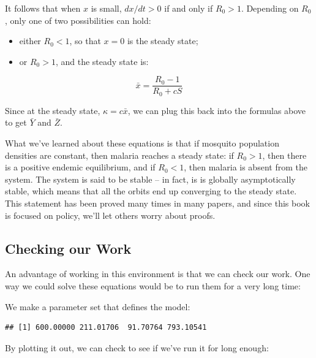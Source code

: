 \documentclass[
]{book}
\begin{document}
It follows that when \(x\) is small, \(dx/dt>0\) if and only if \(R_0 > 1\). Depending on \(R_0\), only one of two possibilities can hold:

\begin{itemize}
\item
  either \(R_0<1\), so that \(x=0\) is the steady state;
\item
  or \(R_0 > 1\), and the steady state is:
\end{itemize}

\begin{equation}
\bar x = \frac{R_0 -1}{R_0 + c S} 
\end{equation}

Since at the steady state, \(\kappa = c \bar x\), we can plug this back into the formulas above to get \(\bar Y\) and \(\bar Z\).

What we've learned about these equations is that if mosquito population densities are constant, then malaria reaches a steady state: if \(R_0 >1\), then there is a positive endemic equilibrium, and if \(R_0 < 1\), then malaria is absent from the system. The system is said to be stable -- in fact, is is globally asymptotically stable, which means that all the orbits end up converging to the steady state. This statement has been proved many times in many papers, and since this book is focused on policy, we'll let others worry about proofs.

\subsection{Checking our Work}\label{checking-our-work}

An advantage of working in this environment is that we can check our work. One way we could solve these equations would be to run them for a very long time:

We make a parameter set that defines the model:

\begin{verbatim}
## [1] 600.00000 211.01706  91.70764 793.10541
\end{verbatim}

By plotting it out, we can check to see if we've run it for long enough:
\end{document}
